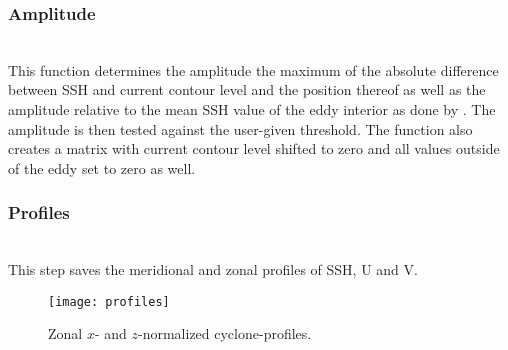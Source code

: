 \subsubsection{Amplitude} \label{filter:amp}
\\
This function determines the amplitude \ie the maximum of the absolute
difference between SSH and current contour level and the position thereof as
well as the amplitude relative to the mean SSH value of the eddy interior as
done by \cite{Chelton2011}. The
amplitude is then tested against the user-given threshold. The function also
creates a matrix with current contour level shifted to zero and all values
outside of the eddy set to zero as well. 
\subsubsection{Profiles}
\\
This step saves the meridional and zonal profiles of SSH, U and V. 
\begin{wrapfigure}{r}{0.4\textwidth}
	\texttt{[image: profiles]}
	\caption{Zonal $x$- and $z$-normalized cyclone-profiles.}
	\label{fig:profiles}
\end{wrapfigure}

